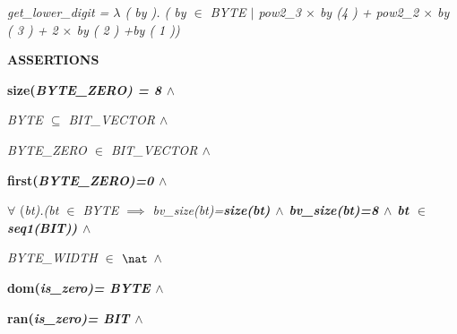 \hspace*{0.20in}\it get\_lower\_digit \rm = $\lambda$ \rm ( \it by \rm )\rm . \rm ( \it by  $\in$  \it BYTE  $\mid$ \hspace*{0.10in}\it pow2\_3  $\times$  \it by \rm (\rm 4 \rm ) \rm + \it pow2\_2  $\times$  \it by \rm ( \rm 3 \rm ) \rm + \rm 2  $\times$  \it by \rm ( \rm 2 \rm ) \rm +\hspace*{0.10in}\it by \rm ( \rm 1 \rm )\hspace*{0.15in}\rm )

\hspace*{0.20in}

\hspace*{0.20in}

\bf ASSERTIONS

\vspace*{4mm}
\hspace*{0.20in}\bf size\rm (\it BYTE\_ZERO\rm ) \rm = \rm 8  $\land$ 

\hspace*{0.20in}\it BYTE  $\subseteq$  \it BIT\_VECTOR  $\land$ 

\hspace*{0.20in}\it BYTE\_ZERO  $\in$  \it BIT\_VECTOR  $\land$ 

\hspace*{0.20in}\bf first\rm (\it BYTE\_ZERO\rm )\rm =\rm 0  $\land$ 

\hspace*{0.20in}

\hspace*{0.20in} $\forall$ \rm (\it bt\rm )\rm .\rm (\it bt  $\in$  \it BYTE  $\implies$  \it bv\_size\rm (\it bt\rm )\rm =\bf size\rm (\it bt\rm )  $\land$  \it bv\_size\rm (\it bt\rm )\rm =\rm 8  $\land$  \it bt  $\in$  \bf seq1\rm (\it BIT\rm )\hspace*{0.10in}\rm )  $\land$ 

\hspace*{0.20in}

\hspace*{0.20in}\it BYTE\_WIDTH  $\in$   $\nat$   $\land$ 

\hspace*{0.40in}

\hspace*{0.20in}\bf dom\rm (\it is\_zero\rm )\rm = \it BYTE  $\land$ 

\hspace*{0.20in}\bf ran\rm (\it is\_zero\rm )\rm = \it BIT\hspace*{0.10in} $\land$ 


